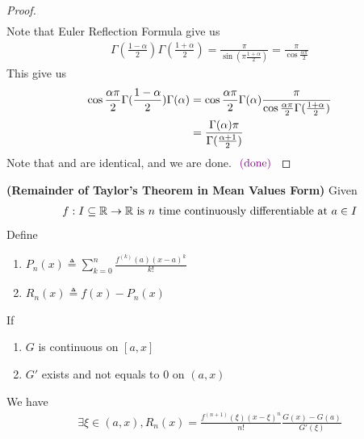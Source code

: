 \documentclass{report}
\begin{document}
\begin{proof}
\begin{align}
\end{align}
Note that Euler Reflection Formula give us 
\begin{align*}
\Gamma (\frac{1-\alpha }{2})\Gamma (\frac{1+\alpha}{2})=\frac{\pi}{\sin (\pi \frac{1+\alpha }{2})}= \frac{\pi}{\cos \frac{\alpha \pi}{2}}
\end{align*}
This give us 
\begin{align}
  \label{game2}
\cos \frac{\alpha \pi}{2}\Gamma (\frac{1-\alpha }{2}) \Gamma (\alpha )&= \cos \frac{\alpha \pi}{2}\Gamma (\alpha )  \frac{\pi}{\cos \frac{\alpha \pi}{2}\Gamma  (\frac{1+\alpha }{2})}\notag\\
&=\frac{\Gamma (\alpha )\pi}{\Gamma (\frac{\alpha +1}{2})}
\end{align}
Note that  and  are identical, and we are done. $\textcolor{violet}{\text{ (done) }}$
\end{proof}
\begin{theorem}
\label{6.5.2}
\textbf{(Remainder of Taylor's Theorem in Mean Values Form)} Given 
\begin{align*}
f:I\subseteq \mathbb{R}\rightarrow \mathbb{R}\text{ is $n$ time continuously differentiable at $a\in I$}
\end{align*}
Define 
\begin{enumerate}[label=(\alph*)]
  \item $P_n(x)\triangleq \sum_{k=0}^n \frac{f^{(k)}(a) (x-a)^k}{k!}$ 
  \item  $R_n(x)\triangleq f(x)-P_n(x)$
\end{enumerate}
If 
\begin{enumerate}[label=(\alph*)]
  \item $G$ is continuous on  $[a,x]$ 
  \item  $G'$ exists and not equals to  $0$ on  $(a,x)$
\end{enumerate}
We have 
\begin{align*}
\exists \xi \in (a,x), R_n(x)=\frac{f^{(n+1)}(\xi)(x-\xi )^n}{n!}  \frac{G(x)-G(a)}{G'(\xi )}
\end{align*}
\end{theorem}
\end{document}
